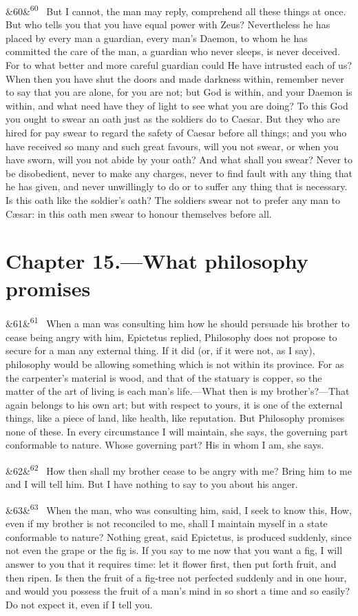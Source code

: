 \documentclass[12pt]{article}
\newcommand{\para}[1][]{\par\noindent\ifx&#1&\else\textsuperscript{\footnotesize #1}~\fi}
\begin{document}
\para[60] But I cannot, the man may reply, comprehend all these things at once. But who tells you that you have equal power with Zeus? Nevertheless he has placed by every man a guardian, every man's Daemon, to whom he has committed the care of the man, a guardian who never sleeps, is never deceived. For to what better and more careful guardian could He have intrusted each of us? When then you have shut the doors and made darkness within, remember never to say that you are alone, for you are not; but God is within, and your Daemon is within, and what need have they of light to see what you are doing? To this God you ought to swear an oath just as the soldiers do to Caesar. But they who are hired for pay swear to regard the safety of Caesar before all things; and you who have received so many and such great favours, will you not swear, or when you have sworn, will you not abide by your oath? And what shall you swear? Never to be disobedient, never to make any charges, never to find fault with any thing that he has given, and never unwillingly to do or to suffer any thing that is necessary. Is this oath like the soldier's oath? The soldiers swear not to prefer any man to Cæsar: in this oath men swear to honour themselves before all.

\section*{Chapter 15.---What philosophy promises}

\para[61] When a man was consulting him how he should persuade his brother to cease being angry with him, Epictetus replied, Philosophy does not propose to secure for a man any external thing. If it did (or, if it were not, as I say), philosophy would be allowing something which is not within its province. For as the carpenter's material is wood, and that of the statuary is copper, so the matter of the art of living is each man's life.—What then is my brother's?—That again belongs to his own art; but with respect to yours, it is one of the external things, like a piece of land, like health, like reputation. But Philosophy promises none of these. In every circumstance I will maintain, she says, the governing part conformable to nature. Whose governing part? His in whom I am, she says.

\para[62] How then shall my brother cease to be angry with me? Bring him to me and I will tell him. But I have nothing to say to you about his anger.

\para[63] When the man, who was consulting him, said, I seek to know this, How, even if my brother is not reconciled to me, shall I maintain myself in a state conformable to nature? Nothing great, said Epictetus, is produced suddenly, since not even the grape or the fig is. If you say to me now that you want a fig, I will answer to you that it requires time: let it flower first, then put forth fruit, and then ripen. Is then the fruit of a fig-tree not perfected suddenly and in one hour, and would you possess the fruit of a man's mind in so short a time and so easily? Do not expect it, even if I tell you.
\end{document}
